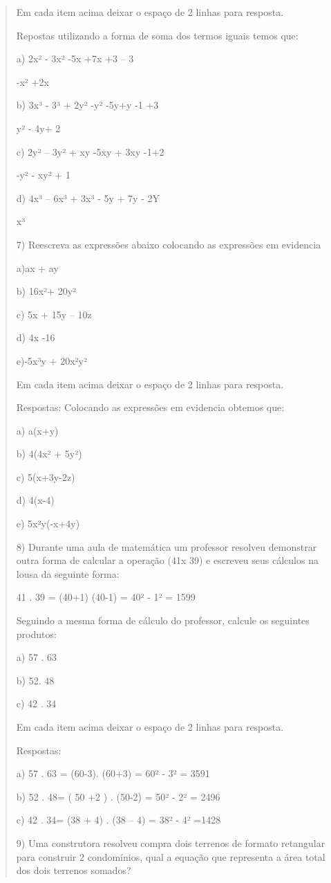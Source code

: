\begin{quote}
\begin{escolha}
Em cada item acima deixar o espaço de 2 linhas para resposta.

Repostas utilizando a forma de soma dos termos iguais temos que:

a) 2x² - 3x² -5x +7x +3 -- 3

-x² +2x

b) 3x³ - 3³ + 2y² -y² -5y+y -1 +3

y² - 4y+ 2

c) 2y² -- 3y² + xy -5xy + 3xy -1+2

-y² - xy² + 1

d) 4x³ -- 6x³ + 3x³ - 5y + 7y - 2Y

x³

7) Reescreva as expressões abaixo colocando as expressões em evidencia

a)ax + ay

b) 16x²+ 20y²

c) 5x + 15y -- 10z

d) 4x -16

e)-5x³y + 20x²y²

Em cada item acima deixar o espaço de 2 linhas para resposta.

Respostas: Colocando as expressões em evidencia obtemos que:

a) a(x+y)

b) 4(4x² + 5y²)

c) 5(x+3y-2z)

d) 4(x-4)

e) 5x²y(-x+4y)

8) Durante uma aula de matemática um professor resolveu demonstrar outra
forma de calcular a operação (41x 39) e escreveu seus cálculos na lousa
da seguinte forma:

41 . 39 = (40+1) (40-1) = 40² - 1² = 1599

Seguindo a mesma forma de cálculo do professor, calcule os seguintes
produtos:

a) 57 . 63

b) 52. 48

c) 42 . 34

Em cada item acima deixar o espaço de 2 linhas para resposta.

Respostas:

a) 57 . 63 = (60-3). (60+3) = 60² - 3² = 3591

b) 52 . 48= ( 50 +2 ) . (50-2) = 50² - 2² = 2496

c) 42 . 34= (38 + 4) . (38 -- 4) = 38² - 4² =1428

9) Uma construtora resolveu compra dois terrenos de formato retangular
para construir 2 condomínios, qual a equação que representa a área total
dos dois terrenos somados?


\end{escolha}
\end{quote}
